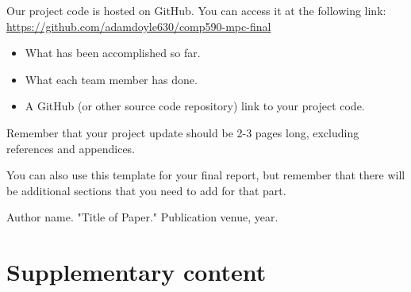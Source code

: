 \documentclass[conference]{IEEEtran}
\begin{document}
Our project code is hosted on GitHub. You can access it at the following link:
\url{https://github.com/adamdoyle630/comp590-mpc-final}

\begin{itemize}
\item What has been accomplished so far.

\item What each team member has done.

\item A GitHub (or other source code repository) link to your project code.
\end{itemize}

Remember that your project update should be 2-3 pages long, excluding references and appendices.

You can also use this template for your final report, but remember that there will be additional sections that you need to add for that part.

\begin{thebibliography}{9}

Author name. "Title of Paper." Publication venue, year.

\end{thebibliography}

\appendices
\section{Supplementary content}

\end{document}
